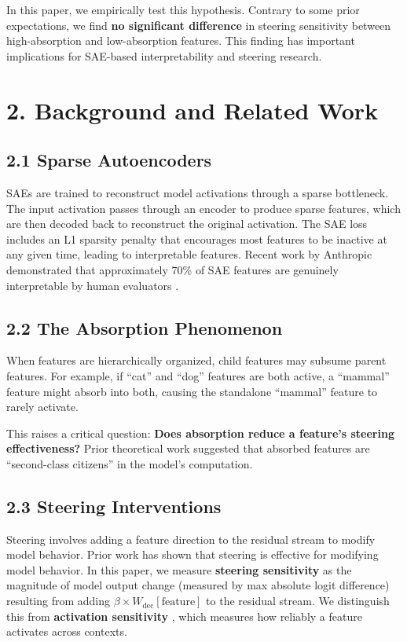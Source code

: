 \documentclass{article}
\begin{document}
In this paper, we empirically test this hypothesis. Contrary to some prior expectations, we find \textbf{no significant difference} in steering sensitivity between high-absorption and low-absorption features. This finding has important implications for SAE-based interpretability and steering research.


\section{2. Background and Related Work}

\subsection{2.1 Sparse Autoencoders}

SAEs are trained to reconstruct model activations through a sparse bottleneck. The input activation passes through an encoder to produce sparse features, which are then decoded back to reconstruct the original activation. The SAE loss includes an L1 sparsity penalty that encourages most features to be inactive at any given time, leading to interpretable features. Recent work by Anthropic demonstrated that approximately 70\% of SAE features are genuinely interpretable by human evaluators \citep{Bricken2023}.

\subsection{2.2 The Absorption Phenomenon}

When features are hierarchically organized, child features may subsume parent features. For example, if ``cat'' and ``dog'' features are both active, a ``mammal'' feature might absorb into both, causing the standalone ``mammal'' feature to rarely activate.

This raises a critical question: \textbf{Does absorption reduce a feature's steering effectiveness?} Prior theoretical work suggested that absorbed features are ``second-class citizens'' in the model's computation.

\subsection{2.3 Steering Interventions}

Steering involves adding a feature direction to the residual stream to modify model behavior. Prior work \citep{Subramani2022,Zou2023} has shown that steering is effective for modifying model behavior. In this paper, we measure \textbf{steering sensitivity} as the magnitude of model output change (measured by max absolute logit difference) resulting from adding $\beta \times W_{\text{dec}}[\text{feature}]$ to the residual stream. We distinguish this from \textbf{activation sensitivity} \citep{Tian2025}, which measures how reliably a feature activates across contexts.
\end{document}
